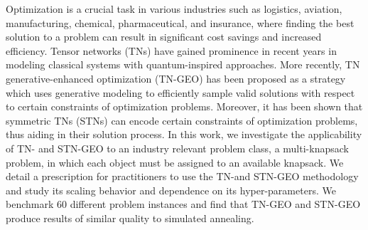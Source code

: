 Optimization is a crucial task in various industries such as logistics, aviation, manufacturing, chemical, pharmaceutical, and insurance, where finding the best solution to a problem can result in significant cost savings and increased efficiency. Tensor networks (TNs) have gained prominence in recent years in modeling classical systems with quantum-inspired approaches. More recently, TN generative-enhanced optimization (TN-GEO) has been proposed as a strategy which uses generative modeling to efficiently sample valid solutions with respect to certain constraints of optimization problems. Moreover, it has been shown that symmetric TNs (STNs) can encode certain constraints of optimization problems, thus aiding in their solution process. In this work, we investigate the applicability of TN- and STN-GEO to an industry relevant problem class, a multi-knapsack problem, in which each object must be assigned to an available knapsack. We detail a prescription for practitioners to use the TN-and STN-GEO methodology and study its scaling behavior and dependence on its hyper-parameters. We benchmark 60 different problem instances and find that TN-GEO and STN-GEO produce results of similar quality to simulated annealing. 